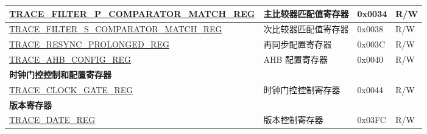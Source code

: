\begin{longtable}{ | p{7.2cm} | p{6cm} | p{1.3cm} | p{1cm} | }
\hyperref[regdesc:TRACEFILTERPCOMPARATORMATCHREG]{TRACE\_FILTER\_P\_COMPARATOR\_MATCH\_REG} & 主比较器匹配值寄存器 & 0x0034 & R/W \\ \hline
\hyperref[regdesc:TRACEFILTERSCOMPARATORMATCHREG]{TRACE\_FILTER\_S\_COMPARATOR\_MATCH\_REG} & 次比较器匹配值寄存器 & 0x0038 & R/W \\ \hline
\hyperref[regdesc:TRACERESYNCPROLONGEDREG]{TRACE\_RESYNC\_PROLONGED\_REG} & 再同步配置寄存器 & 0x003C & R/W \\ \hline
\hyperref[regdesc:TRACEAHBCONFIGREG]{TRACE\_AHB\_CONFIG\_REG} & AHB 配置寄存器 & 0x0040 & R/W \\ \hline
\multicolumn{4}{|l|}{\textbf{时钟门控控制和配置寄存器}} \\ \hline
\hyperref[regdesc:TRACECLOCKGATEREG]{TRACE\_CLOCK\_GATE\_REG} & 时钟门控控制寄存器 & 0x0044 & R/W \\ \hline
\multicolumn{4}{|l|}{\textbf{版本寄存器}} \\ \hline
\hyperref[regdesc:TRACEDATEREG]{TRACE\_DATE\_REG} & 版本控制寄存器 & 0x03FC & R/W \\ \hline
\end{longtable}
